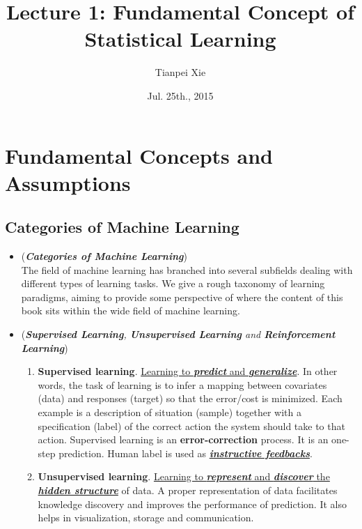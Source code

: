 \documentclass[11pt]{article}
\begin{document}
\title{Lecture 1: Fundamental Concept of Statistical Learning}
\author{ Tianpei Xie}
\date{ Jul. 25th., 2015 }
\maketitle
\tableofcontents
\newpage
\section{Fundamental  Concepts and Assumptions}
\subsection{Categories of Machine Learning}
\begin{itemize}
\item \begin{remark} (\textbf{\emph{Categories of Machine Learning}})\\
The field of machine learning has branched into several subfields dealing with different types of learning tasks. We give a rough taxonomy of learning paradigms, aiming to provide some perspective of where the content of this book sits within the wide field of machine learning.
\end{remark}

\item \begin{remark} (\emph{\textbf{Supervised Learning}, \textbf{Unsupervised Learning} and \textbf{Reinforcement Learning}}) 
\begin{enumerate}
\item \textbf{Supervised learning}.  \underline{Learning to \emph{\textbf{predict}} and \emph{\textbf{generalize}}}. In other words, the task of learning is to infer a mapping between covariates (data) and responses (target) so that the error/cost is minimized. Each example is a description of situation (sample) together with a specification (label) of the correct action the system should take to that action. Supervised learning is an \textbf{error-correction} process. It is an one-step prediction. Human label is used as  \underline{\textbf{\emph{instructive feedbacks}}}. 

\item \textbf{Unsupervised learning}.  \underline{Learning to \emph{\textbf{represent}} and \emph{\textbf{discover}} the  \emph{\textbf{hidden structure}}} of data. A proper representation of data facilitates knowledge discovery and improves the performance of prediction. It also helps in visualization, storage and communication. 


\end{enumerate}
\end{remark}
\end{itemize}
\end{document}

